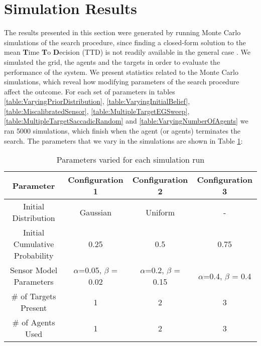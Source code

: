 \section{Simulation Results}



The results presented in this section were generated by running Monte Carlo simulations of the search procedure, since finding a closed-form solution to the mean \textbf{T}ime \textbf{T}o \textbf{D}ecision (TTD) is not readily available in the general case \cite{Chung2012AnalysisStrategies}. We simulated the grid, the agents and the targets in order to evaluate the performance of the system.
We present statistics related to the Monte Carlo simulations, which reveal how modifying parameters of the search procedure affect the outcome. For each set of parameters in tables \ref{table:VaryingPriorDistribution}, \ref{table:VaryingInitialBelief}, \ref{table:MiscalibratedSensor}, \ref{table:MultipleTargetEGSweep}, \ref{table:MultipleTargetSaccadicRandom} and \ref{table:VaryingNumberOfAgents} we ran 5000 simulations, which finish when the agent (or agents) terminates the search. The parameters that we vary in the simulations are shown in Table \ref{table:SimRunParameters}: 

\begin{table}[H]
    \centering
    \begin{tabular}{|c|c|c|c|}
    \hline
         Parameter& Configuration 1 & Configuration 2 & Configuration 3 \\
         \hline
         Initial Distribution & Gaussian & Uniform & - \\
         
         \hline
         Initial Cumulative Probability & 0.25 & 0.5 & 0.75 \\
         
         \hline
         Sensor Model Parameters & $\alpha$=0.05, $\beta$ = 0.02 & $\alpha$=0.2, $\beta$ = 0.15 &
         $\alpha$=0.4, $\beta$ = 0.4 \\
         
         \hline
         \# of Targets Present & 1 & 2 & 3 \\
         
         \hline
         \# of Agents Used & 1 & 2 & 3 \\
         
         \hline
    \end{tabular}
    \caption{Parameters varied for each simulation run}
    \label{table:SimRunParameters}
\end{table}

